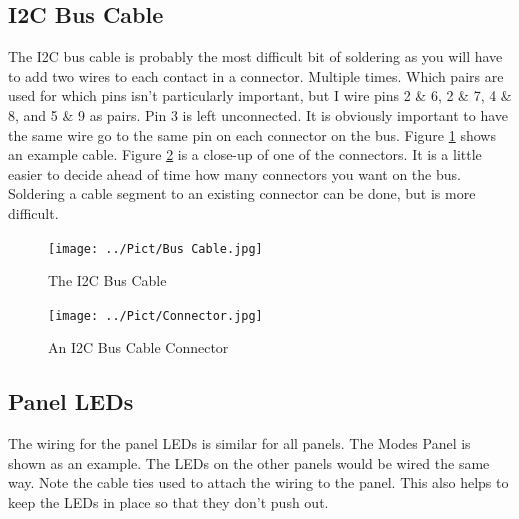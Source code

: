 \documentclass[10pt, openany]{book}
\begin{document}
\subsection{I2C Bus Cable}
The I2C bus cable is probably the most difficult bit of soldering as you will have to add two wires to each contact in a connector.  Multiple times.  Which pairs are used for which pins isn't particularly important, but I wire pins 2 \& 6, 2 \& 7, 4 \& 8, and 5 \& 9 as pairs.  Pin 3 is left unconnected.  It is obviously important to have the same wire go to the same pin on each connector on the bus.  Figure \ref{fig:Cable1} shows an example cable.  Figure \ref{fig:Cable2} is a close-up of one of the connectors.  It is a little easier to decide ahead of time how many connectors you want on the bus.  Soldering a cable segment to an existing connector can be done, but is more difficult.

\begin{figure}[ht!]
  \centering
  \texttt{[image: ../Pict/Bus Cable.jpg]}
  \caption{The I2C Bus Cable}
  \label{fig:Cable1}
\end{figure}

\begin{figure}[ht!]
  \centering
  \texttt{[image: ../Pict/Connector.jpg]}
  \caption{An I2C Bus Cable Connector}
  \label{fig:Cable2}
\end{figure}

\subsection{Panel LEDs}
The wiring for the panel LEDs is similar for all panels.  The Modes Panel is shown as an example.  The LEDs on the other panels would be wired the same way.  Note the cable ties used to attach the wiring to the panel.  This also helps to keep the LEDs in place so that they don't push out.
\end{document}

